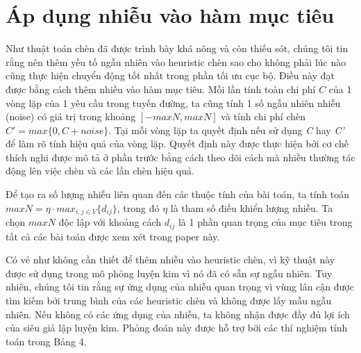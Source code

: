 \section{Áp dụng nhiễu vào hàm mục tiêu}
Như thuật toán chèn đã được trình bày khá nông và còn thiếu sót, chúng tôi tin rằng nên thêm yếu tố ngẫu nhiên vào heuristic chèn sao cho không phải lúc nào cũng thực hiện chuyển động tốt nhất trong phần tối ưu cục bộ. Điều này đạt được bằng cách thêm nhiều vào hàm mục tiêu. Mỗi lần tính toàn chi phí $C$ của 1 vòng lặp của 1 yêu cầu trong tuyến đường, ta cũng tính 1 số ngẫu nhiên nhiễu (noise) có giá trị trong khoảng $\left[ -maxN, maxN \right]$ và tính chi phí chèn $C'=max\{ 0, C+noise \}$. Tại mỗi vòng lặp ta quyết định nếu sử dụng \textit{C} hay \textit{C'} để làm rõ tính hiệu quả của vòng lặp. Quyết định này được thực hiện bởi cơ chế thích nghi được mô tả ở phần trước bằng cách theo dõi cách mà nhiều thường tác động lên việc chèn và các lần chèn hiệu quả.

Để tạo ra số lượng nhiễu liên quan đến các thuộc tính của bài toán, ta tính toán $maxN = \eta\cdot max_{i,j \in V} \{d_{ij}\}$, trong đó $\eta$ là tham số điều khiển lượng nhiễu. Ta chọn $maxN$ độc lập với khoảng cách $d_{ij}$ là 1 phần quan trọng của mục tiêu trong tất cả các bài toán được xem xét trong paper này.

Có vẻ như không cần thiết để thêm nhiễu vào heuristic chèn, vì kỹ thuật này được sử dụng trong mô phỏng luyện kim vì nó đã có sẵn sự ngẫu nhiên. Tuy nhiên, chúng tôi tin rằng sự ứng dụng của nhiễu quan trọng vì vùng lân cận được tìm kiếm bởi trung bình của các heuristic chèn và không được lấy mẫu ngẫu nhiên. Nếu không có các ứng dụng của nhiễu, ta không nhận được đầy đủ lợi ích của siêu giả lập luyện kim. Phỏng đoán này được hỗ trợ bởi các thí nghiệm tính toán trong Bảng 4.
